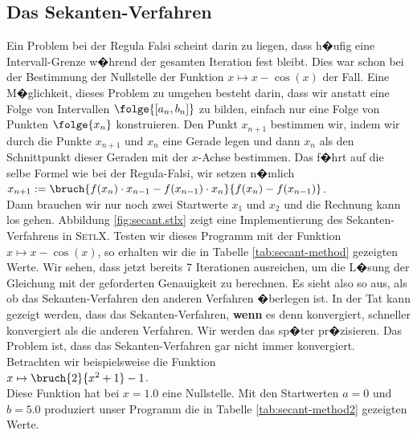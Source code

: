 \subsection{Das Sekanten-Verfahren}
Ein Problem bei der Regula Falsi scheint darin zu liegen, dass h�ufig eine
Intervall-Grenze w�hrend der gesamten Iteration fest bleibt.  Dies war schon bei der
Bestimmung der Nullstelle der Funktion $x \mapsto x - \cos(x)$ der Fall.  Eine
M�glichkeit, dieses Problem zu umgehen besteht darin, dass wir anstatt eine Folge von
Intervallen $\folge{[a_n, b_n]}$ zu bilden, einfach nur eine Folge von Punkten
$\folge{x_n}$ konstruieren.  Den Punkt $x_{n+1}$ bestimmen wir, indem wir durch die Punkte
$x_{n+1}$ und $x_n$ eine Gerade legen und dann $x_n$ als den Schnittpunkt dieser Geraden
mit der $x$-Achse bestimmen.  Das f�hrt auf die selbe Formel wie bei der Regula-Falsi, wir
setzen n�mlich
\\[0.2cm]
\hspace*{1.3cm}
$x_{n+1} := \bruch{f(x_{n}) \cdot x_{n-1} - f(x_{n-1}) \cdot x_n}{f(x_{n}) - f(x_{n-1})}$.
\\[0.2cm]
Dann brauchen wir nur noch zwei Startwerte $x_1$ und $x_2$ und die Rechnung kann los gehen.
Abbildung \ref{fig:secant.stlx} zeigt eine Implementierung des Sekanten-Verfahrens in
\textsc{SetlX}.  Testen wir dieses Programm mit der Funktion $x \mapsto x - \cos(x)$, so
erhalten wir die in Tabelle \ref{tab:secant-method} gezeigten Werte.
Wir sehen, dass jetzt bereits 7 Iterationen ausreichen, um die L�sung der Gleichung mit
der geforderten Genauigkeit zu berechnen.  Es sieht also so aus, als ob das
Sekanten-Verfahren den anderen Verfahren �berlegen ist.  In der Tat kann gezeigt werden, dass
das Sekanten-Verfahren, \textbf{wenn} es denn konvergiert, schneller konvergiert als die anderen
Verfahren. Wir werden das sp�ter pr�zisieren.  Das Problem ist, dass das Sekanten-Verfahren
gar nicht immer konvergiert.  Betrachten wir beispielsweise die Funktion 
\\[0.2cm]
\hspace*{1.3cm}
$x \mapsto \bruch{2}{x^2 + 1} - 1$. 
\\[0.2cm]
Diese Funktion hat bei $x = 1.0$ eine Nullstelle.  Mit
den Startwerten $a = 0$ und $b = 5.0$ produziert unser Programm die in Tabelle
\ref{tab:secant-method2}
gezeigten Werte.


